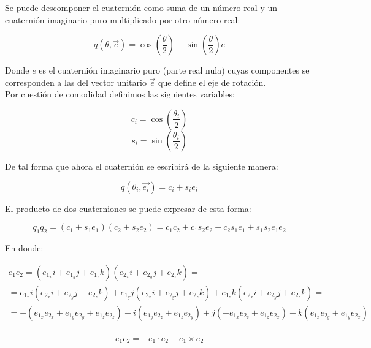 \documentclass[10pt, a4paper]{report}
\begin{document}
Se puede descomponer el cuaternión como suma de un número real y un cuaternión imaginario puro multiplicado por otro número real:

\begin{equation}
q( \theta , \vec{e}) = \cos \left(\frac{\theta}{2}\right) + \sin \left(\frac{\theta}{2}\right) e  
\end{equation}

Donde $e$ es el cuaternión imaginario puro (parte real nula) cuyas componentes se corresponden a las del vector unitario $\vec{e}$ que define el eje de rotación.\\

Por cuestión de comodidad definimos las siguientes variables:

\begin{equation}
c_i = \cos \left( \frac{\theta_i}{2} \right)
\end{equation}
\begin{equation}
s_i = \sin \left( \frac{\theta_i}{2} \right)
\end{equation}

De tal forma que ahora el cuaternión se escribirá de la siguiente manera:

\begin{equation}
q(\theta_i, \vec{e_i}) = c_i + s_i e_i
\end{equation}

El producto de dos cuaterniones se puede expresar de esta forma:

\begin{equation}
q_1 q_2 = \left( c_1 + s_1 e_1 \right) \left( c_2 + s_2 e_2 \right) = c_1 c_2 + c_1 s_2 e_2 + c_2 s_1 e_1 + s_1 s_2 e_1 e_2
\end{equation}

En donde:

\begin{multline}
e_1 e_2 = (e_{1_x} i + e_{1_y} j + e_{1_z} k)(e_{2_x} i + e_{2_y} j + e_{2_z} k) = \\
= e_{1_x} i (e_{2_x} i + e_{2_y} j + e_{2_z} k) + e_{1_y} j (e_{2_x} i + e_{2_y} j + e_{2_z} k) + e_{1_z} k (e_{2_x} i + e_{2_y} j + e_{2_z} k) = \\
= -(e_{1_x} e_{2_x} + e_{1_y} e_{2_y} + e_{1_z} e_{2_z}) + i (e_{1_y} e_{2_z} + e_{1_z} e_{2_y}) + j (-e_{1_x} e_{2_z} + e_{1_z} e_{2_x}) + k (e_{1_x} e_{2_y} + e_{1_y} e_{2_x}) \\
\end{multline}

\begin{equation} \label{eq: e_1e_2}
e_1 e_2 =  -e_1 \cdot e_2 + e_1 \times e_2
\end{equation}
\end{document}
